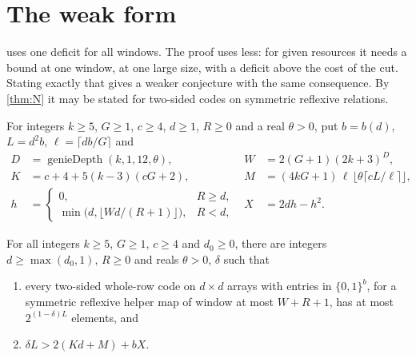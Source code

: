 \section{The weak form}\label{sec:weak}

 uses one deficit for all windows. The proof uses less: for given resources it needs a bound at one
window, at one large size, with a deficit above the cost of the cut. Stating exactly that gives a weaker conjecture
with the same consequence. By \cref{thm:N} it may be stated for two-sided codes on symmetric reflexive relations.

For integers $k\ge5$, $G\ge1$, $c\ge4$, $d\ge1$, $R\ge0$ and a real $\theta>0$, put $b=b(d)$, $L=d^2b$, $\ell=\lceil db/G\rceil$ and
\begin{align*}
  D&=\operatorname{genieDepth}(k,1,12,\theta),&
  W&=2(G+1)(2k+3)^{D},\\
  K&=c+4+5(k-3)(cG+2),&
  M&=(4kG+1)\,\ell\,\bigl\lfloor\theta\lceil cL/\ell\rceil\bigr\rfloor,\\
  h&=\begin{cases}0,&R\ge d,\\ \min\bigl(d,\lfloor Wd/(R+1)\rfloor\bigr),&R<d,\end{cases}&
  X&=2dh-h^2 .
\end{align*}

\begin{conjecture}\label{conj:weak}
For all integers $k\ge5$, $G\ge1$, $c\ge4$ and $d_0\ge0$, there are integers $d\ge\max(d_0,1)$, $R\ge0$ and reals $\theta>0$, $\delta$ such that
\begin{enumerate}[label=(\roman*),leftmargin=2em]
\item every two-sided whole-row code on $d\times d$ arrays with entries in $\{0,1\}^{b}$, for a symmetric reflexive
helper map of window at most $W+R+1$, has at most $2^{(1-\delta)L}$ elements, and
\item $\delta L>2(Kd+M)+bX$.
\end{enumerate}
\end{conjecture}

